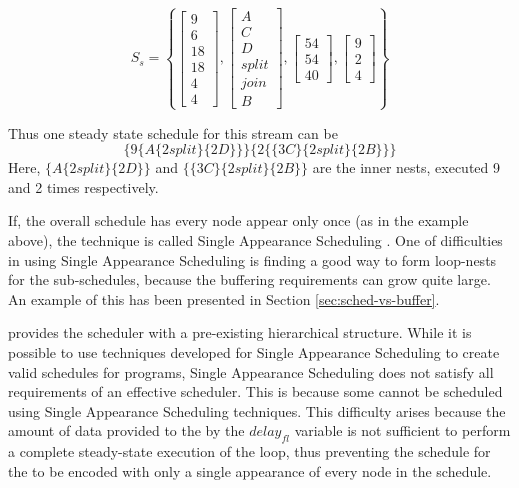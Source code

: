 \begin{displaymath}
S_{s} = \left\{ \left[
\begin{array}{c}
9 \\ 6 \\ 18 \\ 18 \\ 4 \\ 4
\end{array} \right], \left[
\begin{array}{c}
A \\ C \\ D \\ split \\ join \\ B
\end{array}
\right], \left[
\begin{array}{c}
54 \\ 54 \\ 40
\end{array}
\right], \left[
\begin{array}{c}
9 \\ 2 \\ 4
\end{array}
\right]\right\}
\end{displaymath}

\noindent Thus one steady state schedule for this stream can be
$$\{9\{A\{2 split\}\{2D\}\}\}\{2\{\{3C\}\{2 split\}\{2B\}\}\}$$
Here, $\{A\{2 split\}\{2D\}\}$ and $\{\{3C\}\{2 split\}\{2B\}\}$
are the inner nests, executed 9 and 2 times respectively.

If, the overall schedule has every {\StreamIt} node appear only
once (as in the example above), the technique is called Single
Appearance Scheduling \cite{bhattacharyya94looped}. One of
difficulties in using Single Appearance Scheduling is finding a
good way to form loop-nests for the sub-schedules, because the
buffering requirements can grow quite large.  An example of this
has been presented in Section \ref{sec:sched-vs-buffer}.

{\StreamIt} provides the scheduler with a pre-existing
hierarchical structure. While it is possible to use techniques
developed for Single Appearance Scheduling to create valid
schedules for {\StreamIt} programs, Single Appearance Scheduling
does not satisfy all requirements of an effective {\StreamIt}
scheduler. This is because some {\feedbackloops} cannot be
scheduled using Single Appearance Scheduling techniques. This
difficulty arises because the amount of data provided to the
{\feedbackloop} by the $delay_{fl}$ variable is not sufficient to
perform a complete steady-state execution of the loop, thus
preventing the schedule for the {\feedbackloop} to be encoded with
only a single appearance of every node in the schedule.

